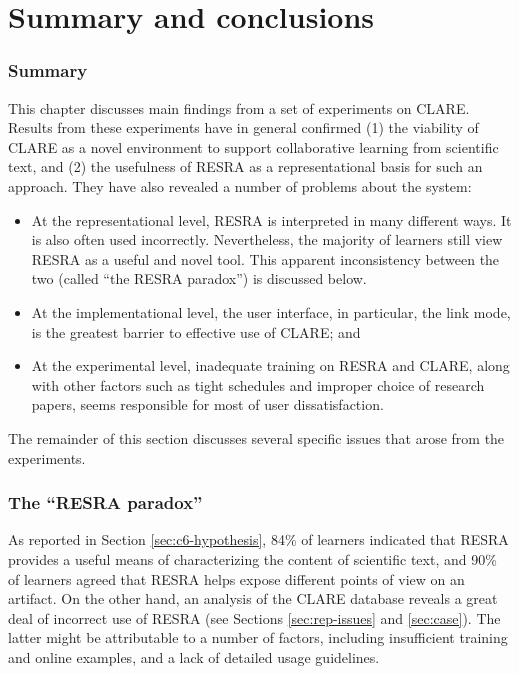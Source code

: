 \section{Summary and conclusions}
\label{sec:c6-discussions}

\subsubsection{Summary}

This chapter discusses main findings from a set of experiments on CLARE.
Results from these experiments have in general confirmed (1) the viability
of CLARE as a novel environment to support collaborative learning from
scientific text, and (2) the usefulness of RESRA as a representational
basis for such an approach. They have also revealed a number of problems
about the system:

\begin{itemize}
\item At the representational level, RESRA is interpreted in many
  different ways. It is also often used incorrectly. Nevertheless, the
  majority of learners still view RESRA as a useful and novel tool.  This
  apparent inconsistency between the two (called ``the RESRA paradox'') is
  discussed below.
  
\item At the implementational level, the user interface, in particular,
  the link mode, is the greatest barrier to effective use of CLARE; and
  
\item At the experimental level, inadequate training on RESRA and CLARE,
  along with other factors such as tight schedules and improper choice of
  research papers, seems responsible for most of user dissatisfaction.
\end{itemize}

The remainder of this section discusses several specific issues
that arose from the experiments. 


\subsubsection{The ``RESRA paradox''}

As reported in Section \ref{sec:c6-hypothesis}, 84\% of learners indicated
that RESRA provides a useful means of characterizing the content of
scientific text, and 90\% of learners agreed that RESRA helps expose
different points of view on an artifact. On the other hand, an analysis of
the CLARE database reveals a great deal of incorrect use of RESRA (see
Sections \ref{sec:rep-issues} and \ref{sec:case}). The latter might be
attributable to a number of factors, including insufficient training and
online examples, and a lack of detailed usage guidelines.

